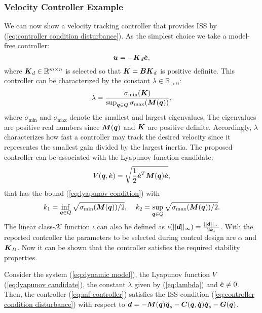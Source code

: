 \subsubsection{Velocity Controller Example}
We can now show a velocity tracking controller that provides ISS by (\ref{eq:controller condition disturbance}). As the simplest choice we take a model-free controller:
\begin{equation} \label{eq:mf controller}
    \boldsymbol{u} = -\boldsymbol{K}_d \dot{\boldsymbol{e}},
\end{equation}
where $\boldsymbol{K}_d \in \mathbb{R}^{m \times n}$ is selected so that $\boldsymbol{K}=\boldsymbol{B} \boldsymbol{K}_d$ is positive definite. This controller can be characterized by the constant $\lambda \in \mathbb{R}_{>0}$:
\begin{equation} \label{eq:lambda}
    \lambda = \frac{\sigma_{\min}(\boldsymbol{K})}{\sup_{{\boldsymbol{q}} \in Q} \sigma_{\max}(\boldsymbol{M}({\boldsymbol{q}}))},
\end{equation}
where $\sigma_{\min}$ and $\sigma_{\max}$ denote the smallest and largest eigenvalues. The eigenvalues are positive real numbers since $\boldsymbol{M}({\boldsymbol{q}})$ and $\boldsymbol{K}$ are positive definite. Accordingly, $\lambda$ characterizes how fast a controller may track the desired velocity since it representes the smallest gain divided by the largest inertia. The proposed controller can be associated with the Lyapunov function candidate:
\begin{equation} \label{eq:lyapunov candidate}
    V({\boldsymbol{q}},\dot{\boldsymbol{e}}) = \sqrt{\frac{1}{2} \dot{\boldsymbol{e}}^T \boldsymbol{M}({\boldsymbol{q}}) \dot{\boldsymbol{e}}},
\end{equation}
that has the bound (\ref{eq:lyapunov condition}) with 
\begin{equation} 
    k_1= \inf_{{\boldsymbol{q}} \in Q} \sqrt{\sigma_{\min} (\boldsymbol{M}({\boldsymbol{q}}))/2}, \;\;\;\; k_2= \sup_{{\boldsymbol{q}} \in Q} \sqrt{\sigma_{\max} (\boldsymbol{M}({\boldsymbol{q}}))/2}.
\end{equation}
The linear class-$\mathcal{K}$ function $\iota$ can also be defined as $\iota(||\boldsymbol{d}||_\infty)=\frac{||\boldsymbol{d}||_\infty}{2k_1}$. With the reported controller the parameters to be selected during control design are $\alpha$ and $\boldsymbol{K}_D$. Now it can be shown that the controller satisfies the required stability properties.
\begin{theorem}
    Consider the system (\ref{eq:dynamic model}), the Lyapunov function $V$ (\ref{eq:lyapunov candidate}), the constant $\lambda$ given by (\ref{eq:lambda}) and $\dot{\boldsymbol{e}} \neq 0$. Then, the controller (\ref{eq:mf controller}) satisfies the ISS condition (\ref{eq:controller condition disturbance}) with respect to $\boldsymbol{d} = -\boldsymbol{M}({\boldsymbol{q}})\ddot{{\boldsymbol{q}}}_s-\boldsymbol{C}({\boldsymbol{q}},\dot{{\boldsymbol{q}}})\dot{{\boldsymbol{q}}}_s-\boldsymbol{G}({\boldsymbol{q}})$.
\end{theorem}
